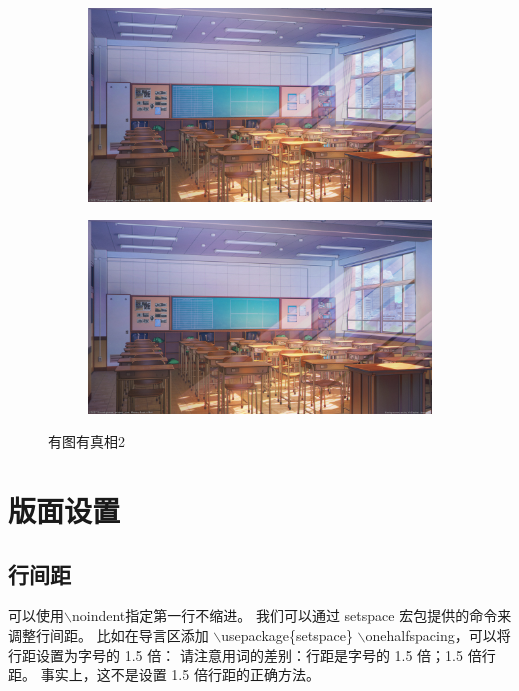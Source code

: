 \documentclass{thesis}
\begin{document}
\begin{figure}[htbp]
    \centering
    \begin{subfigure}[b]{0.45\textwidth}
        \includegraphics[width=\textwidth]{classroom.png}
        \label{fig:image1}
    \end{subfigure}
    \hfill
    \begin{subfigure}[b]{0.45\textwidth}
        \includegraphics[width=\textwidth]{classroom.png}
        \label{fig:image2}
    \end{subfigure}
    \caption{有图有真相2}
    \label{fig:twosubfigs004}
\end{figure}
\section{版面设置}
\subsection{行间距}
\noindent 可以使用$\backslash$noindent指定第一行不缩进。
我们可以通过 setspace 宏包提供的命令来调整行间距。
比如在导言区添加
$\backslash$usepackage\{setspace\}
$\backslash$onehalfspacing，可以将行距设置为字号的 1.5 倍：
请注意用词的差别：行距是字号的 1.5 倍；1.5 倍行距。
事实上，这不是设置 1.5 倍行距的正确方法。
\end{document}
